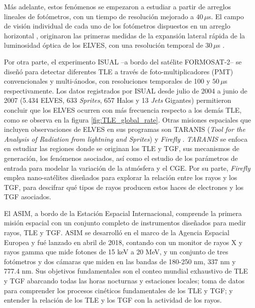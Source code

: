 \documentclass[11pt,oneside,openany,letter]{book}
\begin{document}
Más adelante, estos fenómenos se empezaron a estudiar a partir de arreglos lineales de fotómetros, con un tiempo de resolución mejorado a $40\,\mu$s. El campo de visión individual de cada uno de los fotómetros dispuestos en un arreglo horizontal \cite{InanEtal1997}, originaron las primeras medidas de la expansión lateral rápida de la luminosidad óptica de los ELVES, con una resolución temporal de $30\,\mu$s . 

Por otra parte, el experimento ISUAL \cite{chen2008} --a bordo del sat\'elite FORMOSAT-2-- se diseñó para detectar diferentes TLE a través de foto-multiplicadores (PMT) convencionales y multi-ánodos, con resoluciones temporales de 100 y $50\,\mu$s respectivamente. Los datos registrados por ISUAL desde julio de 2004 a junio de 2007 (5.434 ELVES, 633 \textit{Sprites}, 657 Halos y 13 \textit{Jets} Gigantes) permitieron concluir que los ELVES ocurren con m\'as frecuencia respecto a los demás TLE, como se observa en la figura \ref{fig:TLE_global_rate}. Otras misiones espaciales que incluyen observaciones de ELVES en sus programas son TARANIS (\textit{Tool for the Analysis of Radiation from lightning and Sprites}) \cite{lefeuvre2008taranis} y \textit{Firefly} \cite{rowland2011nsf}. \textit{TARANIS} se enfoca en estudiar las regiones donde se originan los TLE y TGF, sus mecanismos de generación, los fenómenos asociados, así como el estudio de los parámetros de entrada para modelar la variación de la atmósfera y el CGE. Por su parte, \textit{Firefly} emplea nano-satélites diseñados para explorar la relación entre los rayos y los TGF, para descifrar qué tipos de rayos producen estos haces de electrones y los TGF asociados.

El ASIM, \cite{neubertEtal2019} a bordo de la Estaci\'on Espacial Internacional, comprende la primera misión espacial con un conjunto completo de instrumentos diseñados para medir rayos, TLE y TGF. ASIM se desarroll\'o en el marco de la Agencia Espacial Europea y fu\'e lanzado en abril de 2018, contando con un monitor de rayos X y rayos gamma que mide fotones de 15 keV a 20 MeV, y un conjunto de tres fotómetros y dos cámaras que miden en las bandas de 180-250 nm, 337 nm y 777.4 nm. Sus objetivos fundamentales son el conteo mundial exhaustivo de TLE y TGF abarcando todas las horas nocturnas y estaciones locales; toma de datos para comprender los procesos cinéticos fundamentales de los TLE y TGF; y entender la relación de los TLE y los TGF con la actividad de los rayos.

\end{document}
